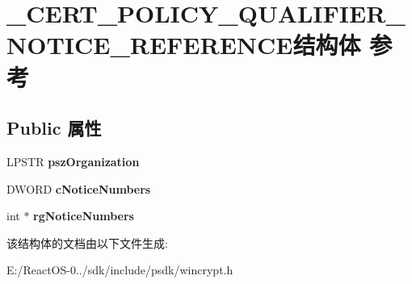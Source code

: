 \hypertarget{struct___c_e_r_t___p_o_l_i_c_y___q_u_a_l_i_f_i_e_r___n_o_t_i_c_e___r_e_f_e_r_e_n_c_e}{}\section{\+\_\+\+C\+E\+R\+T\+\_\+\+P\+O\+L\+I\+C\+Y\+\_\+\+Q\+U\+A\+L\+I\+F\+I\+E\+R\+\_\+\+N\+O\+T\+I\+C\+E\+\_\+\+R\+E\+F\+E\+R\+E\+N\+C\+E结构体 参考}
\label{struct___c_e_r_t___p_o_l_i_c_y___q_u_a_l_i_f_i_e_r___n_o_t_i_c_e___r_e_f_e_r_e_n_c_e}
\subsection*{Public 属性}
\begin{DoxyCompactItemize}
\item 
\mbox{\label{struct___c_e_r_t___p_o_l_i_c_y___q_u_a_l_i_f_i_e_r___n_o_t_i_c_e___r_e_f_e_r_e_n_c_e_af54f7de3db62870455e05813274e0d2c}} 
L\+P\+S\+TR {\bfseries psz\+Organization}
\item 
\mbox{\label{struct___c_e_r_t___p_o_l_i_c_y___q_u_a_l_i_f_i_e_r___n_o_t_i_c_e___r_e_f_e_r_e_n_c_e_a9e0cdcdab8ae9960c0f9b44cac34e1a6}} 
D\+W\+O\+RD {\bfseries c\+Notice\+Numbers}
\item 
\mbox{\label{struct___c_e_r_t___p_o_l_i_c_y___q_u_a_l_i_f_i_e_r___n_o_t_i_c_e___r_e_f_e_r_e_n_c_e_a0a39801d3a3b3188e830e1c63fe621a7}} 
int $\ast$ {\bfseries rg\+Notice\+Numbers}
\end{DoxyCompactItemize}


该结构体的文档由以下文件生成\+:\begin{DoxyCompactItemize}
\item 
E\+:/\+React\+O\+S-\/0../sdk/include/psdk/wincrypt.\+h\end{DoxyCompactItemize}
